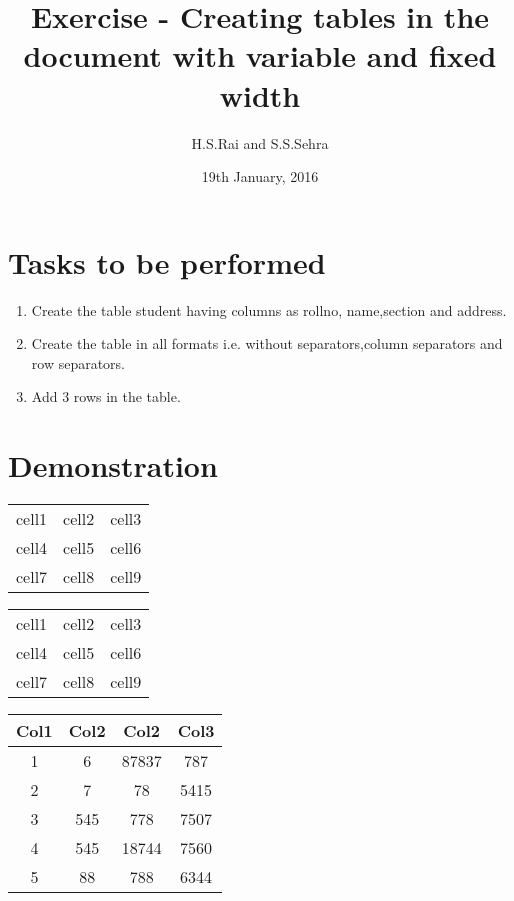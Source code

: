 \documentclass{article}
\title{Exercise  - Creating tables in the document with variable and fixed width}
\author{H.S.Rai and S.S.Sehra}
\date{19th January, 2016}
\begin{document}
	\maketitle	
	\section*{Tasks to be performed}
	\begin{enumerate}	
		\item Create the table student having columns as rollno, name,section and address.
		\item Create the table in all formats i.e. without separators,column separators and row separators.
		\item Add 3 rows in the table.
	\end{enumerate}
	\section*{Demonstration}
\begin{center}
\begin{tabular}{ c c c }
  cell1 & cell2 & cell3 \\ 
  cell4 & cell5 & cell6 \\  
  cell7 & cell8 & cell9    
\end{tabular}
\end{center}
\begin{center}
	\begin{tabular}{ | c | c | c | } 
		\hline
		cell1 & cell2 & cell3 \\ 
		cell4 & cell5 & cell6 \\ 
		cell7 & cell8 & cell9 \\ 
		\hline
	\end{tabular}
\end{center}

\vspace{1cm}

\begin{center}
	\begin{tabular}{||c c c c||} 
		\hline
		Col1 & Col2 & Col2 & Col3 \\ 
		\hline\hline
		1 & 6 & 87837 & 787 \\ 
		\hline
		2 & 7 & 78 & 5415 \\
		\hline
		3 & 545 & 778 & 7507 \\
		\hline
		4 & 545 & 18744 & 7560 \\
		\hline
		5 & 88 & 788 & 6344 \\ 
		\hline
	\end{tabular}
\end{center}
\end{document}
